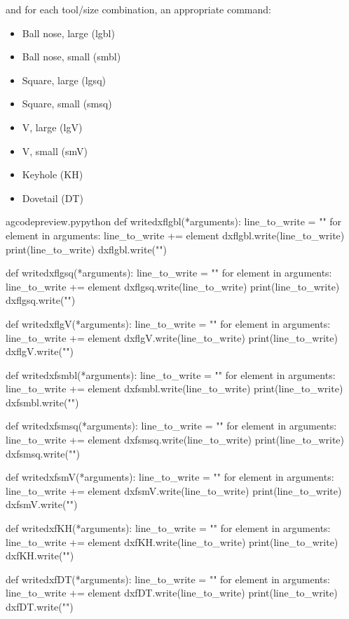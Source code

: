 \documentclass{ltxdoc}
\begin{document}
\noindent and for each tool/size combination, an appropriate command:

\begin{itemize}
\item Ball nose, large (lgbl)
\item Ball nose, small (smbl)
\item Square, large (lgsq)
\item Square, small (smsq)
\item V, large (lgV)
\item V, small (smV)
\item Keyhole (KH)
\item Dovetail (DT)
\end{itemize}
 
\lstset{firstnumber=\thegcpy}
\begin{writecode}{a}{gcodepreview.py}{python}
def writedxflgbl(*arguments):
    line_to_write = ""
    for element in arguments:
        line_to_write += element
    dxflgbl.write(line_to_write)
    print(line_to_write)
    dxflgbl.write("\n")

def writedxflgsq(*arguments):
    line_to_write = ""
    for element in arguments:
        line_to_write += element
    dxflgsq.write(line_to_write)
    print(line_to_write)
    dxflgsq.write("\n")

def writedxflgV(*arguments):
    line_to_write = ""
    for element in arguments:
        line_to_write += element
    dxflgV.write(line_to_write)
    print(line_to_write)
    dxflgV.write("\n")

def writedxfsmbl(*arguments):
    line_to_write = ""
    for element in arguments:
        line_to_write += element
    dxfsmbl.write(line_to_write)
    print(line_to_write)
    dxfsmbl.write("\n")

def writedxfsmsq(*arguments):
    line_to_write = ""
    for element in arguments:
        line_to_write += element
    dxfsmsq.write(line_to_write)
    print(line_to_write)
    dxfsmsq.write("\n")

def writedxfsmV(*arguments):
    line_to_write = ""
    for element in arguments:
        line_to_write += element
    dxfsmV.write(line_to_write)
    print(line_to_write)
    dxfsmV.write("\n")

def writedxfKH(*arguments):
    line_to_write = ""
    for element in arguments:
        line_to_write += element
    dxfKH.write(line_to_write)
    print(line_to_write)
    dxfKH.write("\n")

def writedxfDT(*arguments):
    line_to_write = ""
    for element in arguments:
        line_to_write += element
    dxfDT.write(line_to_write)
    print(line_to_write)
    dxfDT.write("\n")

\end{writecode}
\addtocounter{gcpy}{64}
%
 
\end{document}
